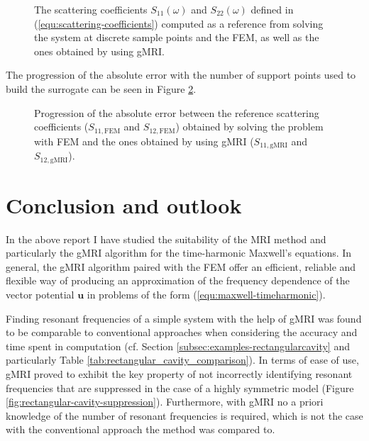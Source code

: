 \documentclass[11pt, a4paper]{article}
\begin{document}
\begin{figure}[ht]
    \centering
    
    \caption{The scattering coefficients $S_11(\omega)$ and $S_22(\omega)$
    defined in (\ref{equ:scattering-coefficients}) computed as a reference
    from solving the system at discrete sample points and the
    \acrshort{FEM}, as well as the ones obtained by using \acrshort{gMRI}.}
    \label{fig:circular-waveguide-scattering}
\end{figure}

The progression of the
absolute error with the number of support points used to build the surrogate
can be seen in Figure \ref{fig:circular-waveguide-error}.

\begin{figure}[ht]
    \centering
    
    \caption{Progression of the absolute error between the reference scattering
    coefficients ($S_{11, \textrm{FEM}}$ and $S_{12, \textrm{FEM}}$) obtained by solving the problem with \acrshort{FEM} and the 
    ones obtained by using \acrshort{gMRI} ($S_{11, \textrm{gMRI}}$ and $S_{12, \textrm{gMRI}}$).}
    \label{fig:circular-waveguide-error}
\end{figure}

\clearpage
\newpage
\section{Conclusion and outlook}
\label{sec:conclusion}

In the above report I have studied the suitability of the \acrfull{MRI} method and
particularly the \acrfull{gMRI} algorithm for the time-harmonic Maxwell's equations.
In general, the \acrshort{gMRI} algorithm paired with the \acrfull{FEM} 
offer an efficient, reliable and flexible way of producing an approximation 
of the frequency dependence of the vector potential $\mathbf{u}$ in problems
of the form (\ref{equ:maxwell-timeharmonic}).

Finding resonant frequencies of a simple system with the help of \acrshort{gMRI} was found to 
be comparable to conventional approaches when considering the accuracy and
time spent in computation (cf. Section \ref{subsec:examples-rectangularcavity}
and particularly Table \ref{tab:rectangular_cavity_comparison}). In terms of
ease of use, \acrshort{gMRI} proved to exhibit the key property of not incorrectly
identifying resonant frequencies that are suppressed in the case of a highly
symmetric model (Figure \ref{fig:rectangular-cavity-suppression}). Furthermore,
with \acrshort{gMRI} no a priori knowledge of the number of resonant frequencies
is required, which is not the case with the conventional approach the method was
compared to.
\end{document}
